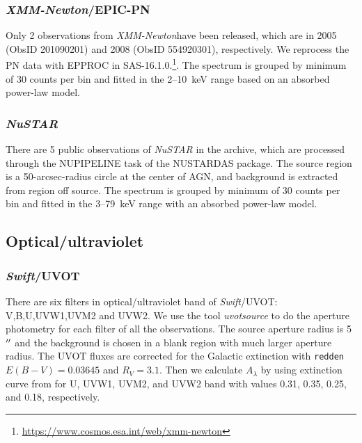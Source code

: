 \documentclass[twocolumn]{aastex63}
\newcommand{\xmm}{{\em XMM-Newton}}
\newcommand{\nustar}{{\em NuSTAR }}
\newcommand{\swift}{{\em Swift}}
\begin{document}

\subsubsection{\xmm/EPIC-PN}
Only 2 observations from \xmm have been released, which are in 2005 (ObsID 201090201) and 2008 (ObsID 554920301), respectively. We reprocess the PN data with {\scriptsize EPPROC} in SAS-16.1.0.\footnote{\url{https://www.cosmos.esa.int/web/xmm-newton}}. The spectrum is grouped by minimum of 30 counts per bin and fitted in the 2--10~keV range based on an absorbed power-law model. 



\subsubsection{\nustar}
There are 5 public observations of \nustar in the archive, which are processed through the {\scriptsize NUPIPELINE} task of the {\scriptsize NUSTARDAS} package. The source region is a 50-arcsec-radius circle at the center of AGN, and background is extracted from region off source. The spectrum is grouped by minimum of 30 counts per bin and fitted in the 3--79~keV range with an absorbed power-law model.


\subsection{Optical/ultraviolet}
\subsubsection{\swift/UVOT}
There are six filters in optical/ultraviolet band of \swift/UVOT: V,B,U,UVW1,UVM2 and UVW2. We use the tool \textit{uvotsource} to do the aperture photometry for each filter of all the observations. The source aperture radius is 5$\mbox{$^{\prime\prime}$}$ and the background is chosen in a blank region with much larger aperture radius. The UVOT fluxes are corrected for the Galactic extinction with \texttt{redden} $E(B-V) = 0.03645$ \citep[see ][]{2018MNRAS.480.3898N} and $R_{V}=3.1$. Then we calculate  $A_{\lambda}$ by using extinction curve from \citet{2007ApJ...663..320F} for U, UVW1, UVM2, and 
UVW2 band with values 0.31, 0.35, 0.25, and 0.18, respectively. 
\end{document}

